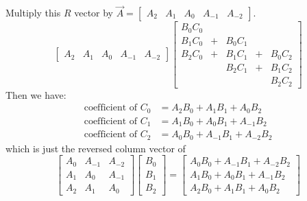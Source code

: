 \documentclass[
11pt,notheorems,hyperref={pdfauthor=whatever}
]{beamer}
\begin{document}
\begin{frame}
    Multiply this $R$ vector by $\vec{A} = \begin{bmatrix}A_{2} & A_{1} & A_{0} & A_{-1} & A_{-2}\end{bmatrix}$.
    \[
        \begin{bmatrix}A_{2} & A_{1} & A_{0} & A_{-1} & A_{-2}\end{bmatrix}
        \begin{bmatrix}
            B_{0}C_{0} \\ 
            B_{1}C_{0} &+&B_{0}C_{1} \\
            B_{2}C_{0} &+&B_{1}C_{1} &+& B_{0}C_{2} \\
                       &&B_{2}C_{1} &+& B_{1}C_{2} \\
                                   &&&& B_{2}C_{2}
        \end{bmatrix}
    \]
    Then we have:
    \[
    \begin{aligned}
        \text{coefficient of } C_{0} &= A_{2}B_{0} + A_{1}B_{1} + A_{0}B_{2}\\
        \text{coefficient of } C_{1} &= A_{1}B_{0} + A_{0}B_{1} + A_{-1}B_{2}\\
        \text{coefficient of } C_{2} &= A_{0}B_{0} + A_{-1}B_{1} + A_{-2}B_{2}
    \end{aligned}
    \]
    which is just the reversed column vector of
    \[
    \begin{bmatrix}
        A_{0} & A_{-1} & A_{-2}\\
        A_{1} & A_{0} & A_{-1}\\
        A_{2} & A_{1} & A_{0}
    \end{bmatrix}
    \begin{bmatrix}
        B_{0} \\ B_{1} \\ B_{2}
    \end{bmatrix}
    =
    \begin{bmatrix}
        A_{0}B_{0} + A_{-1}B_{1} + A_{-2}B_{2}\\
        A_{1}B_{0} + A_{0}B_{1} + A_{-1}B_{2}\\
        A_{2}B_{0} + A_{1}B_{1} + A_{0}B_{2}
    \end{bmatrix}
    \]
\end{frame}
\end{document}
